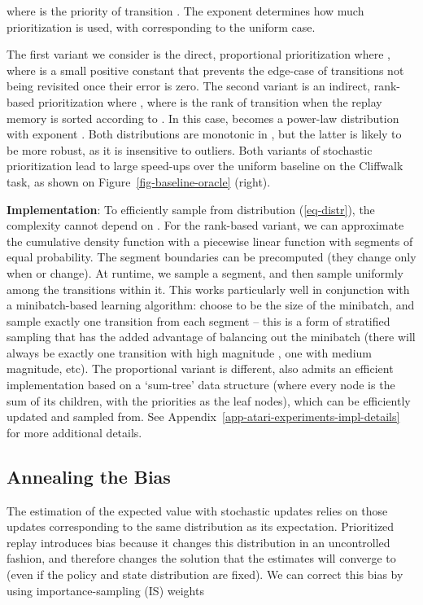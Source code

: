 \documentclass[a4paper]{article}
\begin{document}
where  is the priority of transition .
The exponent  determines how much prioritization is used, with  corresponding to the uniform case.

The first variant we consider is the direct, proportional prioritization where , 
where  is a small positive constant that prevents the edge-case of transitions not being revisited once their 
error is zero.
The second variant is an indirect, rank-based prioritization where ,
where  is the rank of transition  when the replay memory is sorted according to .
In this case,  becomes a power-law distribution with exponent .
Both distributions are monotonic in , but the latter is likely to be more robust, 
as it is insensitive to outliers. 
Both variants of stochastic prioritization lead to large 
speed-ups over the uniform baseline on the Cliffwalk task, as shown on Figure~\ref{fig-baseline-oracle} (right).

{\bf Implementation}: To efficiently sample from distribution (\ref{eq-distr}), the complexity cannot depend on .
For the rank-based variant, we can approximate the cumulative density function with a piecewise linear function with  segments of equal probability.
The segment boundaries can be precomputed (they change only when  or  change).
At runtime, we sample a segment, and then sample uniformly among the transitions
within it. This works particularly well in conjunction with a minibatch-based learning algorithm: 
choose  to be the size of the minibatch, and sample exactly one transition from each segment --
this is a form of stratified sampling that has the added advantage of balancing out the minibatch 
(there will always be exactly one transition with high magnitude , one with medium magnitude, etc).
The proportional variant is different, also admits an efficient implementation based
on a `sum-tree' data structure (where every node is the sum of its children, with the priorities as the leaf nodes), which can be efficiently updated and sampled from.  
See Appendix~\ref{app-atari-experiments-impl-details} for more additional details.







\subsection{Annealing the Bias}
\label{sec-anneal}

The estimation of the expected value with stochastic updates relies on those updates corresponding
to the same distribution as its expectation. Prioritized replay introduces bias because it changes this distribution in an uncontrolled fashion, and therefore changes the solution that the 
estimates will converge to (even if the policy and state distribution are fixed). 
We can correct this bias by using importance-sampling (IS) weights
\end{document}

